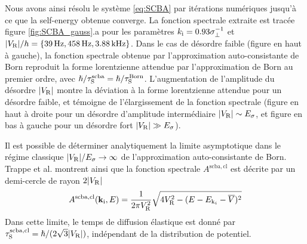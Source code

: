 Nous avons ainsi résolu le système \ref{eq:SCBA} par itérations numériques jusqu'à ce que la self-energy obtenue converge. La fonction spectrale extraite est tracée figure \ref{fig:SCBA_gauss}.a pour les paramètres $k_{\mathrm{i}}=0.93\sigma_{\perp}^{-1}$ et $|V_{\mathrm{R}}|/h=\lbrace \SI{39}{\hertz},\SI{458}{\hertz},\SI{3.88}{\kilo\hertz}\rbrace$. Dans le cas de désordre faible (figure en haut à gauche), la fonction spectrale obtenue par l'approximation auto-consistante de Born reproduit la forme lorentzienne attendue par l'approximation de Born au premier ordre, avec $\hslash/\tau_{\mathrm{S}}^{\mathrm{scba}}=\hslash/\tau_{\mathrm{S}}^{\mathrm{Born}}$. L'augmentation de l'amplitude du désordre $|V_{\mathrm{R}}|$ montre la déviation à la forme lorentzienne attendue pour un désordre faible, et témoigne de l'élargissement de la fonction spectrale (figure en haut à droite pour un désordre d'amplitude intermédiaire $|V_{\mathrm{R}}|\sim E_{\sigma}$, et figure en bas à gauche pour un désordre fort $|V_{\mathrm{R}}|\gg E_{\sigma}$).

Il est possible de déterminer analytiquement la limite asymptotique dans le régime classique $|V_{\mathrm{R}}|/E_{\sigma}\rightarrow\infty$ de l'approximation auto-consistante de Born. Trappe et al. montrent ainsi que la fonction spectrale $A^{\mathrm{scba,cl}}$ est décrite par un demi-cercle de rayon $2|V_{\mathrm{R}}|$ \citep{trappe2015semiclassical}
\begin{equation}
A^{\mathrm{scba,cl}}(\mathbf{k}_{\mathrm{i}},E)=\frac{1}{2\pi V_{\mathrm{R}}^2} \sqrt{4V_{\mathrm{R}}^2-(E-E_{\mathrm{k}_i}-\overline{V})^2}
\end{equation}
Dans cette limite, le temps de diffusion élastique est donné par $\tau_{\mathrm{S}}^{\mathrm{scba,cl}}=\hslash/(2\sqrt{3}|V_{\mathrm{R}}|)$, indépendant de la distribution de potentiel. 

